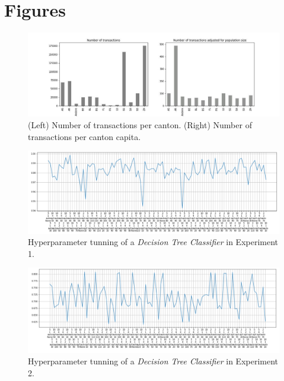 \documentclass[sigplan,screen]{acmart}
\begin{document}
\section{Figures}

\begin{figure}[h]
    \centering
    \includegraphics[width=\linewidth]{reports/figures/cantonal_representation.jpg}
    \caption{(Left) Number of transactions per canton. (Right) Number of transactions per canton capita.}
    \label{fig:cantonal_representation}
\end{figure}

\begin{figure}[h]
    \centering
    \includegraphics[width=\linewidth]{reports/figures/decision_tree_1.png}
    \caption{Hyperparameter tunning of a \emph{Decision Tree Classifier} in Experiment 1.}
    \label{fig:hyp_decision_1}
\end{figure}

\begin{figure}[h]
    \centering
    \includegraphics[width=\linewidth]{reports/figures/decision_tree_2.png}
    \caption{Hyperparameter tunning of a \emph{Decision Tree Classifier} in Experiment 2.}
    \label{fig:hyp_decision_2}
\end{figure}
\end{document}
